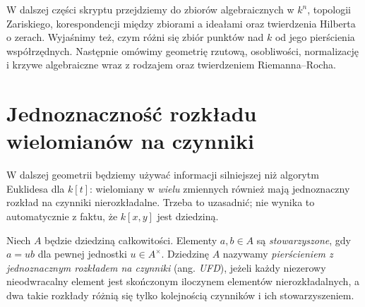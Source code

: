 W dalszej części skryptu przejdziemy do zbiorów algebraicznych
w $k^n$, topologii Zariskiego, korespondencji między zbiorami
a ideałami oraz twierdzenia Hilberta o zerach. Wyjaśnimy też,
czym różni się zbiór punktów nad $k$ od jego pierścienia współrzędnych. Następnie
omówimy geometrię rzutową, osobliwości, normalizację i krzywe
algebraiczne wraz z rodzajem oraz twierdzeniem Riemanna--Rocha.

\section{Jednoznaczność rozkładu wielomianów na czynniki}
\label{sec:ufd-preparation}

W dalszej geometrii będziemy używać informacji silniejszej niż
algorytm Euklidesa dla $k[t]$: wielomiany w \emph{wielu} zmiennych
również mają jednoznaczny rozkład na czynniki nierozkładalne.
Trzeba to uzasadnić; nie wynika to automatycznie z faktu,
że $k[x,y]$ jest dziedziną.

\begin{definicja}
Niech $A$ będzie dziedziną całkowitości. Elementy $a,b\in A$
są \emph{stowarzyszone}, gdy $a=ub$ dla pewnej jednostki
$u\in A^\times$. Dziedzinę $A$ nazywamy \emph{pierścieniem
z jednoznacznym rozkładem na czynniki} (ang. \emph{UFD}), jeżeli
każdy niezerowy nieodwracalny element jest skończonym iloczynem
elementów nierozkładalnych, a dwa takie rozkłady różnią się
tylko kolejnością czynników i ich stowarzyszeniem.
\end{definicja}

